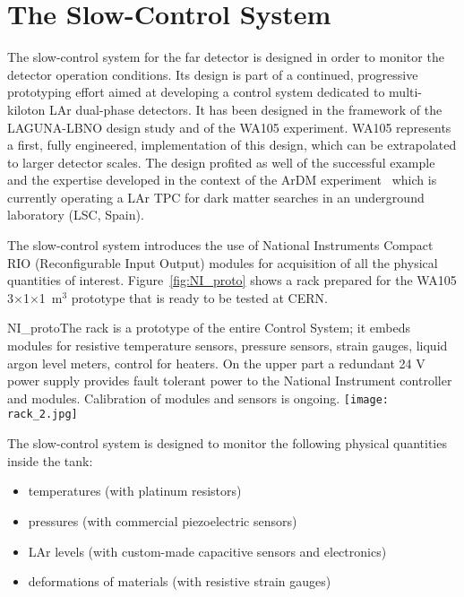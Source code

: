 \section{The Slow-Control System} 
\label{sec:detectors-fd-alt-dcs}

The slow-control system for the far detector is designed in order to monitor the detector operation conditions. Its design is part of a continued,
progressive prototyping effort aimed at developing a control system dedicated to multi-kiloton LAr dual-phase detectors. It has been designed in the framework of the LAGUNA-LBNO design study and of the WA105 experiment. WA105 represents a first, fully engineered,  implementation of this design, which can be extrapolated to larger detector scales. The design profited as well of the successful example and the expertise developed in the context of the ArDM experiment~\cite{Badertscher:2013ygt} which is currently operating a  LAr TPC for dark matter searches in an underground laboratory (LSC, Spain). 

The slow-control system introduces the use of National Instruments Compact RIO (Reconfigurable Input Output) modules for acquisition of all the physical quantities of interest.  Figure~\ref{fig:NI_proto} shows a rack prepared for the WA105 3$\times$1$\times$1~m$^3$ prototype that is ready to be tested at CERN.

\begin{cdrfigure}{NI_proto}{The rack is a  prototype of the entire Control System; it  embeds modules for resistive 
temperature sensors, pressure  sensors, strain gauges, liquid argon level  meters, control for  heaters. On the upper part a redundant 24 V power supply 
provides fault tolerant power to the National Instrument controller and modules.  Calibration of modules and sensors is ongoing.}
\texttt{[image: rack\_2.jpg]}
\end{cdrfigure}

The slow-control system is designed to monitor the following physical quantities inside the tank:
\begin{itemize}
 \item temperatures (with platinum resistors)
 \item pressures (with commercial piezoelectric sensors)
 \item LAr levels (with custom-made capacitive sensors and electronics)
 \item deformations of materials (with resistive strain gauges)
\end{itemize} 

